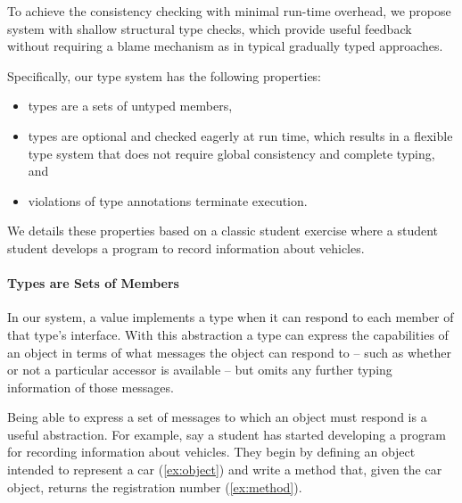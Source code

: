 To achieve the consistency checking with minimal run-time overhead,
we propose system with shallow structural type checks,
which provide useful feedback without requiring a blame mechanism
as in typical gradually typed approaches.


Specifically, our type system has the following properties:

\begin{itemize}
  \item types are a sets of untyped members,
  \item types are optional and checked eagerly at run time,
        which results in a flexible type system that does not require global
        consistency and complete typing, and
  \item violations of type annotations terminate execution.
\end{itemize}


We details these properties
based on a classic student exercise where a student student develops
a program to record information about vehicles.

\paragraph{Types are Sets of Members}

In our system, a value implements a type when it
can respond to each member of that type's interface.
With this abstraction a type can express the capabilities
of an object in terms of what messages the object can respond to 
-- such as whether or not a particular accessor is available --
but omits any further typing information of those messages.

Being able to express a set of messages to which an object
must respond is a useful abstraction. For example, 
say a student has started developing a program for recording
information about vehicles. They begin by defining an object
intended to represent a car (\cref{ex:object}) and write a method that, 
given the car object,
returns the registration number (\cref{ex:method}).

